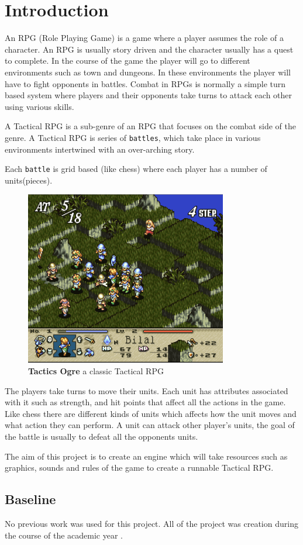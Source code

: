 \section{Introduction} 
\label{introduction}
       
An RPG (Role Playing Game) is a game where a player assumes the role of a character. An RPG is usually story driven and the character usually has a quest to complete. In the course of the game the player will go to different environments such as town and dungeons. In these environments the player will have to fight opponents in battles. Combat in RPGs is normally a simple turn based system where players and their opponents take turns to attack each other using various skills. 

A Tactical RPG is a sub-genre of an RPG that focuses on the combat side of the genre. A Tactical RPG is series of \texttt{battles}, which take place in various environments intertwined with an over-arching story.

Each \texttt{battle} is grid based (like chess) where each player has a number of units(pieces). 
\begin{figure}
	[htbp] \centering 
	\includegraphics[height=3in]{figures/TRPG.png} \caption{\textbf{Tactics Ogre}\cite{to} a classic Tactical RPG } \label{fig:TRPG} 
\end{figure}
The players take turns to move their units. Each unit has attributes associated with it such as strength, and hit points that affect all the actions in the game. Like chess there are different kinds of units which affects how the unit moves and what action they can perform. A unit can attack other player's units, the goal of the battle is usually to defeat all the opponents units.

The aim of this project is to create an engine which will take resources such as graphics, sounds and rules of the game to create a runnable Tactical RPG.

\subsection{Baseline} %
\label{sub:baseline}

No previous work was used for this project. All of the project was creation during the course of the academic year
.

